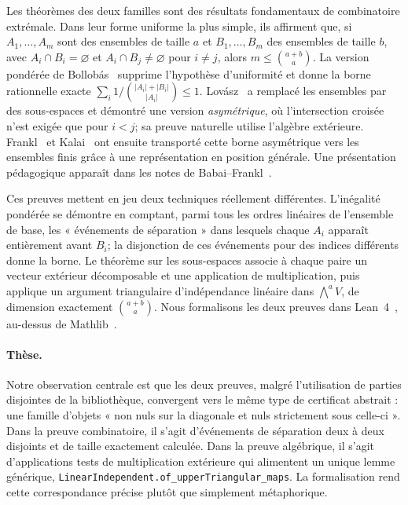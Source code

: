\documentclass[11pt]{article}
\newcommand{\bind}[2]{\binom{#1}{#2}}
\newcommand{\wedgep}[1]{\textstyle\bigwedge^{#1}}
\begin{document}
Les théorèmes des deux familles sont des résultats fondamentaux de combinatoire
extrémale. Dans leur forme uniforme la plus simple, ils affirment que, si
$A_1,\dots,A_m$ sont des ensembles de taille $a$ et $B_1,\dots,B_m$ des ensembles de
taille $b$, avec $A_i\cap B_i=\varnothing$ et $A_i\cap B_j\neq\varnothing$ pour
$i\neq j$, alors $m\le\bind{a+b}{a}$. La version pondérée de
Bollobás~\cite{bollobas1965} supprime l'hypothèse d'uniformité et donne la borne
rationnelle exacte
$\sum_i 1/\bind{|A_i|+|B_i|}{|A_i|}\le 1$. Lovász~\cite{lovasz1977} a remplacé les
ensembles par des sous-espaces et démontré une version \emph{asymétrique}, où
l'intersection croisée n'est exigée que pour $i<j$; sa preuve naturelle utilise
l'algèbre extérieure. Frankl~\cite{frankl1982} et Kalai~\cite{kalai1984} ont ensuite
transporté cette borne asymétrique vers les ensembles finis grâce à une représentation
en position générale. Une présentation pédagogique apparaît dans les notes de
Babai--Frankl~\cite{babaifrankl1992}.

Ces preuves mettent en jeu deux techniques réellement différentes. L'inégalité pondérée
se démontre en comptant, parmi tous les ordres linéaires de l'ensemble de base, les
« événements de séparation » dans lesquels chaque $A_i$ apparaît entièrement avant
$B_i$; la disjonction de ces événements pour des indices différents donne la borne. Le
théorème sur les sous-espaces associe à chaque paire un vecteur extérieur décomposable et
une application de multiplication, puis applique un argument triangulaire
d'indépendance linéaire dans $\wedgep{a}V$, de dimension exactement
$\bind{a+b}{a}$. Nous formalisons les deux preuves dans Lean~4~\cite{lean4}, au-dessus de
Mathlib~\cite{mathlib2020}.

\paragraph{Thèse.} Notre observation centrale est que les deux preuves, malgré
l'utilisation de parties disjointes de la bibliothèque, convergent vers le même type de
certificat abstrait : une famille d'objets « non nuls sur la diagonale et nuls strictement
sous celle-ci ». Dans la preuve combinatoire, il s'agit d'événements de séparation deux à
deux disjoints et de taille exactement calculée. Dans la preuve algébrique, il s'agit
d'applications tests de multiplication extérieure qui alimentent un unique lemme
générique, \lstinline{LinearIndependent.of_upperTriangular_maps}. La formalisation rend
cette correspondance précise plutôt que simplement métaphorique.
\end{document}

